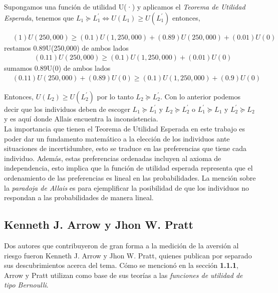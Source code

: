 Supongamos una función de utilidad U(·) y aplicamos el \textit{Teorema de Utilidad Esperada}, tenemos que $L_1 \succeq L^{\prime}_1 \Leftrightarrow U(L_1) \geq U(L^{\prime}_1)$ entonces,

\begin{align*}
    & (1)U(250,000) \geq (0.1)U(1,250,000)+(0.89)U(250,000)+(0.01)U(0)
\end{align*}
\noindent restamos 0.89U(250,000) de ambos lados
\begin{align*}
    & (0.11)U(250,000) \geq (0.1)U(1,250,000) + (0.01)U(0)
\end{align*}
\noindent sumamos 0.89U(0) de ambos lados
\begin{align*}
    & (0.11)U(250,000) + (0.89)U(0) \geq (0.1)U(1,250,000) + (0.9)U(0) 
\end{align*}

Entonces, $U(L_2) \geq U(L^{\prime}_2)$ por lo tanto $L_2 \succeq L^{\prime}_2$. Con lo anterior podemos decir que los individuos deben de escoger $L_1 \succeq L^{\prime}_1$ y $L_2 \succeq L^{\prime}_2$ o $L^{\prime}_1 \succeq L_1$ y $L^{\prime}_2 \succeq L_2$ y es aquí donde Allais encuentra la inconsistencia. \\

La importancia que tienen el Teorema de Utilidad Esperada en este trabajo es poder dar un fundamento matemático a la elección de los individuos ante situaciones de incertidumbre, esto se traduce en las preferencias que tiene cada individuo. Además, estas preferencias ordenadas incluyen al axioma de independencia, esto implica que la función de utilidad esperada representa que el ordenamiento de las preferencias es lineal en las probabilidades. La mención sobre la \textit{paradoja de Allais} es para ejemplificar la posibilidad de que los individuos no respondan a las probabilidades de manera lineal.

\newpage

\subsection{Kenneth J. Arrow y Jhon W. Pratt}

Dos autores que contribuyeron de gran forma a la medición de la aversión al riesgo fueron Kenneth J. Arrow y Jhon W. Pratt, quienes publican por separado sus descubrimientos acerca del tema. Cómo se mencionó en la sección \textbf{1.1.1}, Arrow y Pratt utilizan como base de sus teorías a las \textit{funciones de utilidad de tipo Bernoulli}. \\


